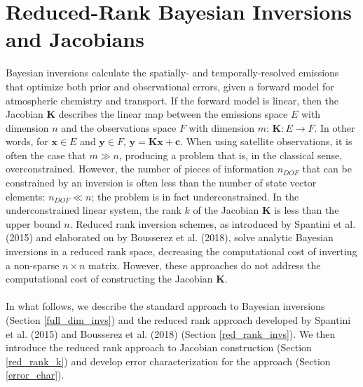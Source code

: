 \documentclass{article}
\newcommand{\x}{\mathbf{x}}
\newcommand{\y}{\mathbf{y}}
\newcommand{\K}{\mathbf{K}}
\begin{document}
\section{Reduced-Rank Bayesian Inversions and Jacobians}{\label{theory}}
Bayesian inversions calculate the spatially- and temporally-resolved emissions that optimize both prior and observational errors, given a forward model for atmospheric chemistry and transport. If the forward model is linear, then the Jacobian $\K$ describes the linear map between the emissions space $E$ with dimension $n$ and the observations space $F$ with dimension $m$: $\K : E \rightarrow F$. In other words, for $\x \in E$ and $\y \in F$, $\y = \K\x + \mathbf{c}$. When using satellite observations, it is often the case that $m \gg n$, producing a problem that is, in the classical sense, overconstrained. However, the number of pieces of information $n_{DOF}$ that can be constrained by an inversion is often less than the number of state vector elements: $n_{DOF} \ll n$; the problem is in fact underconstrained. In the underconstrained linear system, the rank $k$ of the Jacobian $\K$ is less than the upper bound $n$. Reduced rank inversion schemes, as introduced by Spantini et al. (2015) and elaborated on by Bousserez et al. (2018), solve analytic Bayesian inversions in a reduced rank space, decreasing the computational cost of inverting a non-sparse $n \times n$ matrix. However, these approaches do not address the computational cost of constructing the Jacobian $\K$.\\
\\
In what follows, we describe the standard approach to Bayesian inversions (Section \ref{full_dim_invs}) and the reduced rank approach developed by Spantini et al. (2015) and Bousserez et al. (2018) (Section \ref{red_rank_invs}). We then introduce the reduced rank approach to Jacobian construction (Section \ref{red_rank_k}) and develop error characterization for the approach (Section \ref{error_char}).
\end{document}
